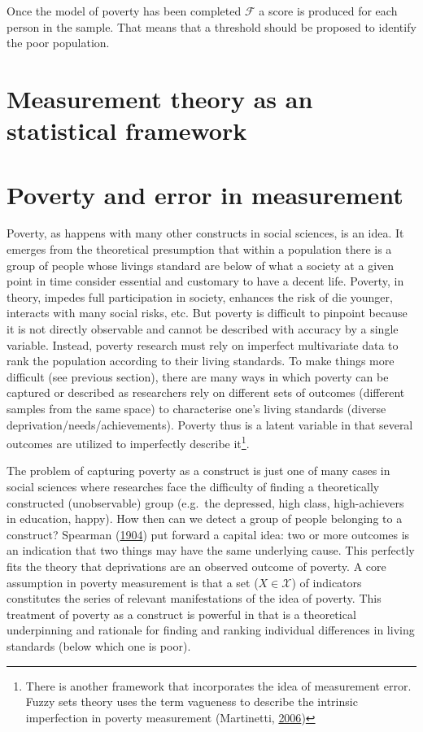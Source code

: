 \documentclass[]{book}
\let\rmarkdownfootnote\footnote%
\def\footnote{\protect\rmarkdownfootnote}
\begin{document}
Once the model of poverty has been completed \(\mathscr F\) a score is produced for each person in the sample. That means that a threshold should be proposed to identify the poor population.

\hypertarget{measurement-theory-as-an-statistical-framework}{%
\section{Measurement theory as an statistical framework}\label{measurement-theory-as-an-statistical-framework}}

\hypertarget{poverty-and-error-in-measurement}{%
\section{Poverty and error in measurement}\label{poverty-and-error-in-measurement}}

Poverty, as happens with many other constructs in social sciences, is an idea. It emerges from the theoretical presumption that within a population there is a group of people whose livings standard are below of what a society at a given point in time consider essential and customary to have a decent life. Poverty, in theory, impedes full participation in society, enhances the risk of die younger, interacts with many social risks, etc. But poverty is difficult to pinpoint because it is not directly observable and cannot be described with accuracy by a single variable. Instead, poverty research must rely on imperfect multivariate data to rank the population according to their living standards. To make things more difficult (see previous section), there are many ways in which poverty can be captured or described as researchers rely on different sets of outcomes (different samples from the same space) to characterise one's living standards (diverse deprivation/needs/achievements). Poverty thus is a latent variable in that several outcomes are utilized to imperfectly describe it\footnote{There is another framework that incorporates the idea of measurement error. Fuzzy sets theory uses the term vagueness to describe the intrinsic imperfection in poverty measurement (Martinetti, \protect\hyperlink{ref-Martinetti2006}{2006})}.

The problem of capturing poverty as a construct is just one of many cases in social sciences where researches face the difficulty of finding a theoretically constructed (unobservable) group (e.g.~the depressed, high class, high-achievers in education, happy). How then can we detect a group of people belonging to a construct? Spearman (\protect\hyperlink{ref-Spearman1904}{1904}) put forward a capital idea: two or more outcomes is an indication that two things may have the same underlying cause. This perfectly fits the theory that deprivations are an observed outcome of poverty. A core assumption in poverty measurement is that a set (\(X \in \mathscr X\)) of indicators constitutes the series of relevant manifestations of the idea of poverty. This treatment of poverty as a construct is powerful in that is a theoretical underpinning and rationale for finding and ranking individual differences in living standards (below which one is poor).
\end{document}
